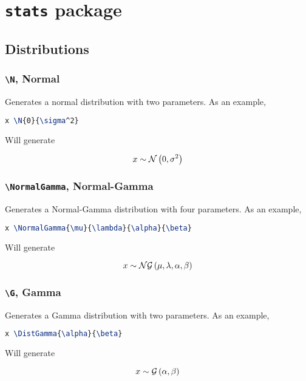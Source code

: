 \documentclass[]{article}
\title{}
\author{}
\begin{document}
\maketitle

\begin{abstract}

\end{abstract}

\section{\texttt{stats} package}

\subsection{Distributions}

\subsubsection{\texttt{\textbackslash N}, Normal}

Generates a normal distribution with two parameters.
As an example,

\begin{lstlisting}[language=TeX]
x \N{0}{\sigma^2}
\end{lstlisting}

Will generate

\[ x \sim \mathcal{N} \left( 0,\sigma^2 \right) \]

\subsubsection{\texttt{\textbackslash NormalGamma}, Normal-Gamma}

Generates a Normal-Gamma distribution with four parameters.
As an example,

\begin{lstlisting}[language=TeX]
x \NormalGamma{\mu}{\lambda}{\alpha}{\beta}
\end{lstlisting}

Will generate

\[ x \sim \mathcal{NG} \left(\mu,\lambda,\alpha,\beta\right) \]

\subsubsection{\texttt{\textbackslash G}, Gamma}

Generates a Gamma distribution with two parameters.
As an example,

\begin{lstlisting}[language=TeX]
x \DistGamma{\alpha}{\beta}
\end{lstlisting}

Will generate

\[ x \sim \mathcal{G} \left(\alpha,\beta\right) \]
\end{document}
